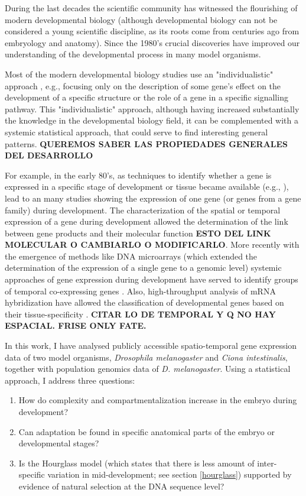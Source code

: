 
During the last decades the scientific community has witnessed the flourishing of modern developmental biology (although developmental biology can not be considered a young scientific discipline, as its roots come from centuries ago from embryology and anatomy). Since the 1980's crucial discoveries \citep{Gilbert1998} have improved our understanding of the developmental process in many model organisms.

Most of the modern developmental biology studies use an "individualistic" approach \citep{Davidson2009}, e.g., focusing only on the description of some gene's effect on the development of a specific structure or the role of a gene in a specific signalling pathway.
%
This "individualistic" approach, although having increased substantially the knowledge in the developmental biology field, it can be complemented with a systemic statistical approach, that could serve to find interesting general patterns. \textbf{QUEREMOS SABER LAS PROPIEDADES GENERALES DEL DESARROLLO} 

For example, in the early 80's, as techniques to identify whether a gene is expressed in a specific stage of development or tissue became available (e.g., \citet{Bialojan1984}), lead to an many studies showing the expression of one gene (or genes from a gene family) during development. The characterization of the spatial or temporal expression of a gene during development allowed the determination of the link between gene products and their molecular function \textbf{ESTO DEL LINK MOLECULAR O CAMBIARLO O MODIFICARLO}.
More recently with the emergence of methods like DNA microarrays (which extended the determination of the expression of a single gene to a genomic level) systemic approaches of gene expression during development have served to identify groups of temporal co-expressing genes \citep{Arbeitman2002}. Also, high-throughput analysis of mRNA hybridization have allowed the classification of developmental genes based on their tissue-specificity \citep{Tomancak2007}. 
\textbf{CITAR LO DE TEMPORAL Y Q NO HAY ESPACIAL. FRISE ONLY FATE.}

In this work, I have analysed publicly accessible spatio-temporal gene expression data of two model organisms, \textit{Drosophila melanogaster} and \textit{Ciona intestinalis}, together with population genomics data of \textit{D. melanogaster}.
Using a statistical approach, I address three questions:
\begin{enumerate}
\item How do complexity and compartmentalization increase in the embryo during development?
\item Can adaptation be found in specific anatomical parts of the embryo or developmental stages? 
\item Is the Hourglass model (which states that there is less amount of inter-specific variation in mid-development; see section \ref{hourglass}) supported by evidence of natural selection at the DNA sequence level?
\end{enumerate}

